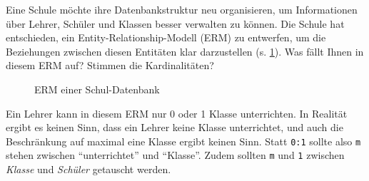 \begin{myexercise}
  Eine Schule möchte ihre Datenbankstruktur neu organisieren, um Informationen über Lehrer, Schüler und Klassen besser verwalten zu können.
  Die Schule hat entschieden, ein Entity-Relationship-Modell (ERM) zu entwerfen, um die Beziehungen zwischen diesen Entitäten klar darzustellen (s. \cref{fig:erm-school}).
  Was fällt Ihnen in diesem \gls{ERM} auf? Stimmen die Kardinalitäten?
  \begin{figure}[H]
    \centering

    \caption{\gls{ERM} einer Schul-Datenbank}
    \label{fig:erm-school}
  \end{figure}

  \begin{myanswer}
    Ein Lehrer kann in diesem \gls{ERM} nur 0 oder 1 Klasse unterrichten. 
    In Realität ergibt es keinen Sinn, dass ein Lehrer keine Klasse unterrichtet, und auch die Beschränkung auf maximal eine Klasse ergibt keinen Sinn.
    Statt \texttt{0:1} sollte also \texttt{m} stehen zwischen ``unterrichtet'' und ``Klasse''. 
Zudem sollten \texttt{m} und \texttt{1} zwischen \textit{Klasse} und \textit{Schüler} getauscht werden.
  \end{myanswer}
\end{myexercise}

